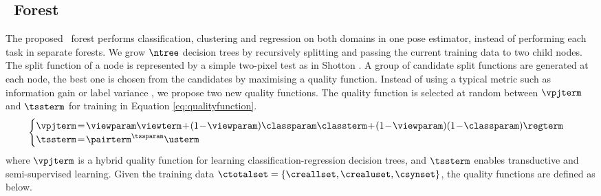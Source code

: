 \subsection{\STR\ Forest} 
\label{sec/hand/methodology:strf}
The proposed \STR\ forest performs classification, clustering and regression on both domains in one pose estimator, instead of performing each task in separate forests.    
We grow $\ntree$ decision trees by recursively splitting and passing the current training data to two child nodes. 
The split function of a node is represented by a simple two-pixel test as in Shotton \etal \cite{Shotton2011}. 
A group of candidate split functions are generated at each node, the best one is chosen from the candidates by maximising a quality function.   
Instead of using a typical metric such as information gain or label variance \cite{Shotton2013}, we propose two new quality functions.
The quality function is selected at random between $\vpjterm$ and $\tssterm$ for training in Equation \ref{eq:qualityfunction}. 
\begin{equation}
	\begin{cases}
		\vpjterm\!=\!\viewparam\viewterm\!+\!(1\!-\!\viewparam)\classparam\classterm\!+\!(1\!-\!\viewparam)(1\!-\!\classparam)\regterm \\ 
		\tssterm\!=\!\pairterm^{\tssparam}\usterm 
	\end{cases}
	\label{eq:qualityfunction}
\end{equation}
where $\vpjterm$ is a hybrid quality function for learning classification-regression decision trees, and $\tssterm$ enables transductive and semi-supervised learning. 
Given the training data $\ctotalset = \{\creallset, \crealuset, \csynset\}$, the quality functions are defined as below.   

